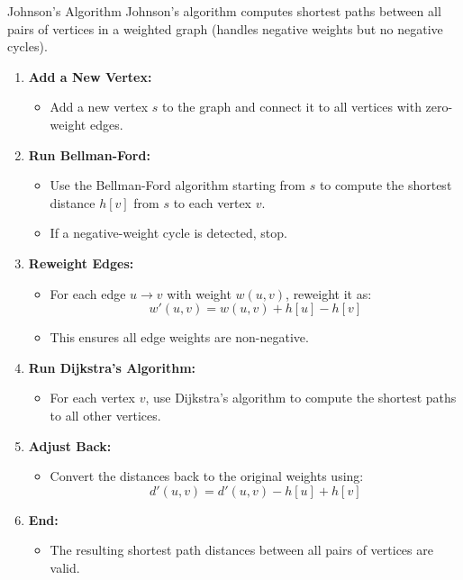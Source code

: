 \begin{usage}[]{Johnson's Algorithm}
    Johnson's algorithm computes shortest paths between all pairs of vertices in a weighted graph (handles negative weights but no negative cycles).

    \begin{enumerate}
        \item \textbf{Add a New Vertex:}
              \begin{itemize}
                  \item Add a new vertex \(s\) to the graph and connect it to all vertices with zero-weight edges.
              \end{itemize}

        \item \textbf{Run Bellman-Ford:}
              \begin{itemize}
                  \item Use the Bellman-Ford algorithm starting from \(s\) to compute the shortest distance \(h[v]\) from \(s\) to each vertex \(v\).
                  \item If a negative-weight cycle is detected, stop.
              \end{itemize}

        \item \textbf{Reweight Edges:}
              \begin{itemize}
                  \item For each edge \(u \to v\) with weight \(w(u, v)\), reweight it as:
                        \[
                            w'(u, v) = w(u, v) + h[u] - h[v]
                        \]
                  \item This ensures all edge weights are non-negative.
              \end{itemize}

        \item \textbf{Run Dijkstra's Algorithm:}
              \begin{itemize}
                  \item For each vertex \(v\), use Dijkstra's algorithm to compute the shortest paths to all other vertices.
              \end{itemize}

        \item \textbf{Adjust Back:}
              \begin{itemize}
                  \item Convert the distances back to the original weights using:
                        \[
                            d'(u, v) = d'(u, v) - h[u] + h[v]
                        \]
              \end{itemize}

        \item \textbf{End:}
              \begin{itemize}
                  \item The resulting shortest path distances between all pairs of vertices are valid.
              \end{itemize}
    \end{enumerate}
\end{usage}



